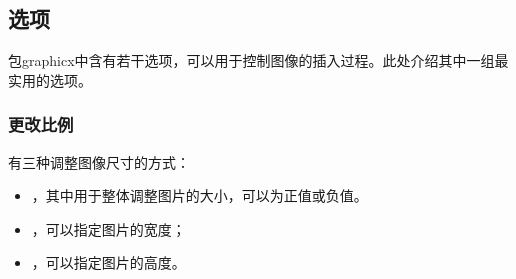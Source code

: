 \subsection{选项}

包\textsf{graphicx}中含有若干选项，可以用于控制图像的插入过程。此处介绍其中一组最实用的选项。

\subsubsection{更改比例}

有三种调整图像尺寸的方式：

\begin{itemize}
    \item {}，其中用于整体调整图片的大小，可以为正值或负值。
    \item {}，可以指定图片的宽度；
    \item {}，可以指定图片的高度。
\end{itemize}

